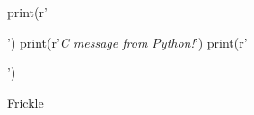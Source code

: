 \documentclass{scrartcl}
\begin{document}
\begin{pycode}
print(r'\begin{center}')
print(r'\textit{C message from Python!}')
print(r'\end{center}')
\end{pycode}
Frickle
\end{document}
